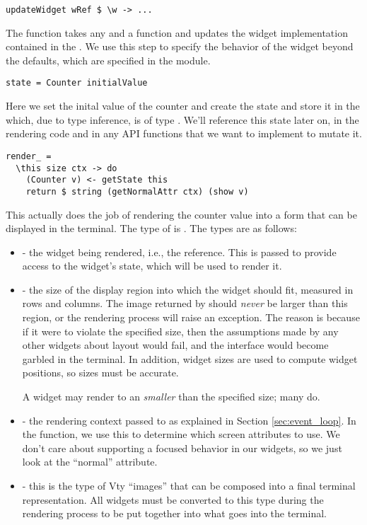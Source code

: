 \begin{verbatim}
updateWidget wRef $ \w -> ...
\end{verbatim}

The  function takes any  and a function
 and updates the widget
implementation contained in the .  We use this step to
specify the behavior of the widget beyond the defaults, which are
specified in the  module.

\begin{verbatim}
state = Counter initialValue
\end{verbatim}

Here we set the inital value of the counter and create the
 state and store it in the  which, due to
type inference, is of type .  We'll reference
this state later on, in the rendering code and in any API functions
that we want to implement to mutate it.

\begin{verbatim}
render_ =
  \this size ctx -> do
    (Counter v) <- getState this
    return $ string (getNormalAttr ctx) (show v)
\end{verbatim}

This actually does the job of rendering the counter value into a form
that can be displayed in the terminal.  The type of  is
.  The
types are as follows:

\begin{itemize}
\item {} - the widget being rendered, i.e., the  reference.  This is passed to provide access to the
  widget's state, which will be used to render it.
\item {} - the size of the display region into which
  the widget should fit, measured in rows and columns.  The image
  returned by  should \textit{never} be larger than this
  region, or the rendering process will raise an exception.  The
  reason is because if it were to violate the specified size, then the
  assumptions made by any other widgets about layout would fail, and
  the interface would become garbled in the terminal.  In addition,
  widget sizes are used to compute widget positions, so sizes must be
  accurate.

  A widget may render to an  \textit{smaller} than the
  specified size; many do.
\item {} - the rendering context passed to 
  as explained in Section \ref{sec:event_loop}.  In the 
  function, we use this to determine which screen attributes to use.
  We don't care about supporting a focused behavior in our
   widgets, so we just look at the ``normal'' attribute.
\item {} - this is the type of Vty ``images'' that can be
  composed into a final terminal representation.  All widgets must be
  converted to this type during the rendering process to be put
  together into what goes into the terminal.
\end{itemize}

